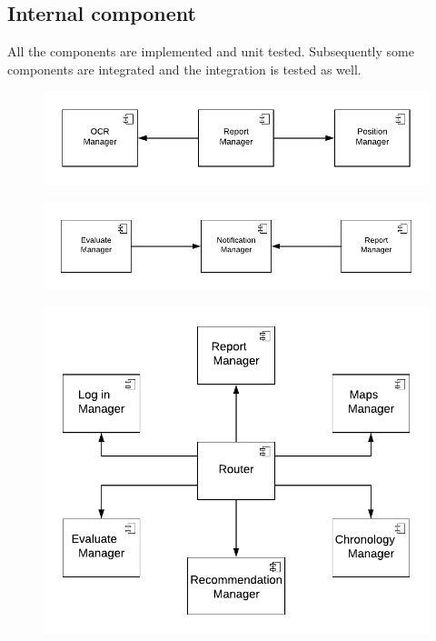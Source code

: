 \documentclass[12pt,a4paper]{report}
\begin{document}
			\subsection{Internal component}
				All the components are implemented and unit tested. Subsequently some components are 
				integrated and the integration is tested as well. 
				\newpage
				\begin{figure}[H]
						\includegraphics [center]{reportIntegration}
						\label{fig: interfaces}
				\end{figure}
				\begin{figure}[H]
						\includegraphics [center]{notificationIntegration}
						\label{fig: interfaces}
				\end{figure}
				\begin{figure}[H]
						\includegraphics [center]{routerIntegration}
						\label{fig: interfaces}
				\end{figure}
\end{document}
